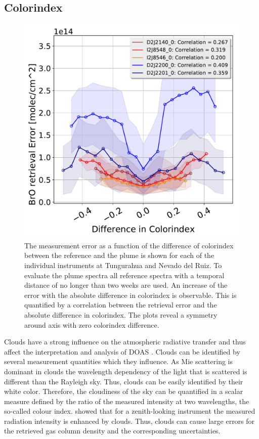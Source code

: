 \subsection{ Colorindex}
\begin{figure}
	\centering
	\includegraphics[width=0.7\linewidth]{Bilder/DiffColidxallInstruments}
	\caption{The  measurement error as a function of the difference of colorindex between the reference and the plume is shown for each of the individual instruments at Tungurahua and Nevado del Ruiz. To evaluate the plume spectra all reference spectra with a temporal distance of no longer than two weeks are used. An increase of the  error with the absolute difference in colorindex is observable. This is quantified by a correlation between the  retrieval error and the absolute difference in colorindex. The plots reveal a symmetry around axis with zero colorindex difference. }
	\label{fig:diffcolidx}
\end{figure}
Clouds  have  a  strong  influence  on  the  atmospheric  radiative  transfer  and  thus  affect  the  interpretation  and  analysis of DOAS \citep{wagner2014cloud}.
Clouds can be identified by several measurement quantities which they influence.
As Mie scattering is dominant in clouds the wavelength dependency of the light that is scattered is different than the Rayleigh sky. Thus, clouds can be easily identified by their white color.
Therefore, the cloudiness of the sky can be quantified in a scalar measure defined by the ratio of the measured intensity at two wavelengths, the so-called colour index.
\cite{wagner2014cloud} showed that for a zenith-looking instrument the measured radiation intensity is enhanced by clouds. Thus, clouds can cause large errors for the retrieved gas column density and the corresponding uncertainties. 
